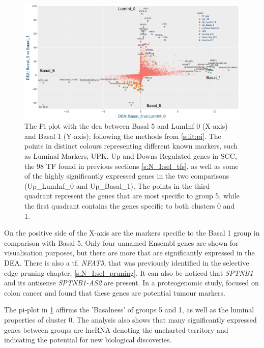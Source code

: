 \begin{figure}
    \centering
    \includegraphics[width=1.0\textwidth,height=1.0\textheight,keepaspectratio]{Sections/Network_II/resources/reward/PI_Basal_5.png}
    \caption[Pi plot highlighting the properties for Basal 5]{The Pi plot with the \acrshort{dea} between Basal 5 and LumInf 0 (X-axis) and Basal 1 (Y-axis); following the methods from \cref{s:lit:pi}. The points in distinct colours representing different known markers, such as Luminal Markers, UPK, Up and Downs Regulated genes in \gls{SCC}, the 98 TF found in previous sections \cref{s:N_I:sel_tfs}, as well as some of the highly significantly expressed genes in the two comparisons (Up\_LumInf\_0 and Up\_Basal\_1). The points in the third quadrant represent the genes that are most specific to group 5, while the first quadrant contains the genes specific to both clusters 0 and 1.}
    \label{fig:N_II:pi_basal_5}
\end{figure}


On the positive side of the X-axis are the markers specific to the Basal 1 group in comparison with Basal 5. Only four unnamed Ensembl genes are shown for visualisation purposes, but there are more that are significantly expressed in the DEA. There is also a \acrlong{tf}, \textit{NFAT5}, that was previously identified in the selective edge pruning chapter, \cref{s:N_I:sel_pruning}. It can also be noticed that \textit{SPTNB1} and its antisense \textit{SPTNB1-AS2} are present. In a proteogenomic study, \citep{Fanayan2013-uj} focused on colon cancer and found that these genes are potential tumour markers.

The pi-plot in \cref{fig:N_II:pi_basal_5} affirms the 'Basalness' of groups 5 and 1, as well as the luminal properties of cluster 0. The analysis also shows that many significantly expressed genes between groups are \acrlong{lncRNA} denoting the uncharted territory and indicating the potential for new biological discoveries.



